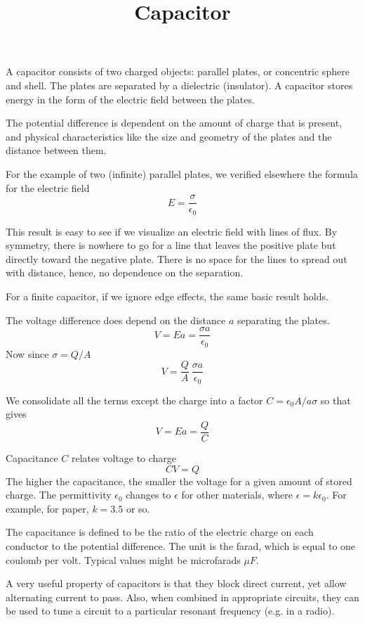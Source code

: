 \documentclass[11pt, oneside]{article}
\title{Capacitor}
\date{}
\begin{document}
\maketitle
\Large


A capacitor consists of two charged objects:  parallel plates, or concentric sphere and shell.  The plates are separated by a dielectric (insulator).  A capacitor stores energy in the form of the electric field between the plates.

The potential difference is dependent on the amount of charge that is present, and physical characteristics like the size and geometry of the plates and the distance between them.

For the example of two (infinite) parallel plates, we verified elsewhere the formula for the electric field
\[ E = \frac{\sigma}{\epsilon_0} \]

This result is easy to see if we visualize an electric field with lines of flux.  By symmetry, there is nowhere to go for a line that leaves the positive plate but directly toward the negative plate.  There is no space for the lines to spread out with distance, hence, no dependence on the separation.

For a finite capacitor, if we ignore edge effects, the same basic result holds. 

The voltage difference does depend on the distance $a$ separating the plates. 
\[ V = Ea = \frac{\sigma a}{\epsilon_0} \]
 Now since $\sigma = Q/A$
\[ V = \frac{Q}{A} \ \frac{\sigma a}{\epsilon_0} \]

We consolidate all the terms except the charge into a factor $C = \epsilon_0 A/a \sigma$ so that gives
\[ V = Ea = \frac{Q}{C} \]

Capacitance $C$ relates voltage to charge
\[ CV = Q \]
The higher the capacitance, the smaller the voltage for a given amount of stored charge.  The permittivity $\epsilon_0$ changes to $\epsilon$ for other materials, where $\epsilon = k \epsilon_0$.  For example, for paper, $k=3.5$ or so.

The capacitance is defined to be the ratio of the electric charge on each conductor to the potential difference.  The unit is the farad, which is equal to one coulomb per volt.  Typical values might be microfarads $\mu F$.

A very useful property of capacitors is that they block direct current, yet allow alternating current to pass.  Also, when combined in appropriate circuits, they can be used to tune a circuit to a particular resonant frequency (e.g. in a radio).
\end{document}
